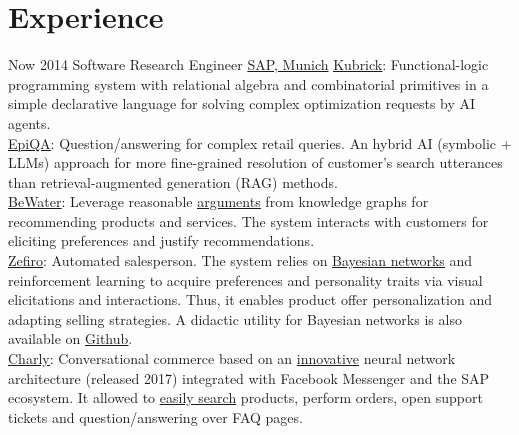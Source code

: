 \documentclass[letterpaper]{twentysecondcv} %
\begin{document}
 \makeprofile %


\section{Experience}

\begin{twenty} %
\twentyitem
    	{Now}
		{2014}
        {Software Research Engineer}
        {\href{https://www.sap.com}{SAP,  Munich}}
        {}
        {
        \textbullet\href{https://blogs.sap.com/2022/04/26/ludwig-experimental-programming-system-for-business-services/}{\underline{Kubrick}}: Functional-logic programming system with relational algebra and combinatorial primitives in a simple declarative language for solving complex optimization requests by AI agents.\\
        \textbullet\href{https://epiqa.cxai.dev.sap/}{\underline{EpiQA}}: Question/answering for complex retail queries. An hybrid AI (symbolic + LLMs) approach for more fine-grained resolution of customer's search utterances than retrieval-augmented generation (RAG) methods.\\
        \textbullet\href{https://community.sap.com/t5/crm-and-cx-blogs-by-sap/argumentation-for-e-commerce-at-semantics-22/ba-p/13534345}{\underline{BeWater}}: Leverage reasonable \href{https://gfrison.com/2024/12/01/defeasible-logic-automatic-argumentation}{\underline{arguments}} from knowledge graphs for recommending products and services. The system interacts with customers for eliciting preferences and justify recommendations.\\
        \textbullet\href{https://community.sap.com/t5/tag/zefiro/tg-p/}{\underline{Zefiro}}: Automated salesperson. The system relies on \href{https://gfrison.com/tags/\#bayesian-inference}{\underline{Bayesian networks}} and reinforcement learning to acquire preferences and personality traits via visual elicitations and interactions. Thus, it enables product offer personalization and adapting selling strategies. A didactic utility for Bayesian networks is also available on \href{https://github.com/sap/bayesian-network-builder}{\underline{Github}}.\\ 
        \textbullet\href{https://sapvideoa35699dc5.hana.ondemand.com/?entry_id=1_kp5hbyih}{\underline{Charly}}: Conversational commerce based on an \href{https://gfrison.com/patents/smoothing-conversational-context}{\underline{innovative}} neural network architecture (released 2017) integrated with Facebook Messenger and the SAP ecosystem. It allowed to \href{https://gfrison.com/patents/concept-search-with-word-embeddings}{\underline{easily search}} products, perform orders, open support tickets and question/answering over FAQ pages.\\
}
\end{twenty}
\end{document}
